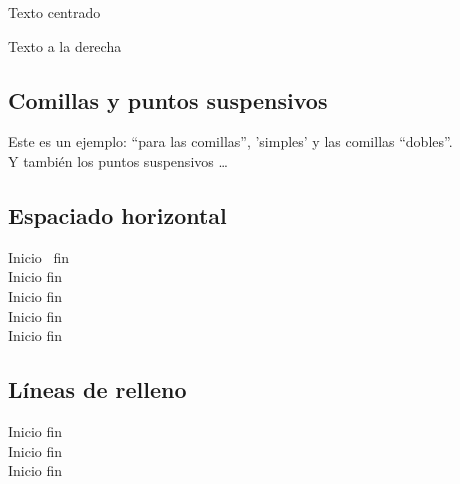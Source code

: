 \documentclass[12pt]{article}
\begin{document}
\begin{center}
Texto centrado
\end{center}

\begin{flushright}
Texto a la derecha
\end{flushright}

\subsection{Comillas y puntos suspensivos}

Este es un ejemplo: “para las comillas”, 'simples' y las comillas “dobles”. \\
Y también los puntos suspensivos \dots %

\subsection{Espaciado horizontal}
\noindent Inicio \, fin \\[0.2cm]
Inicio \quad fin \\[0.2cm]
Inicio \qquad fin \\[0.2cm]
Inicio \hspace{3cm} fin \\[0.2cm]
Inicio \hfill fin \\[0.2cm]
\subsection{Líneas de relleno}
\noindent Inicio \hfill fin \\[0.5cm]
Inicio \hrulefill fin \\[0.5cm]
Inicio \dotfill fin \\[0.5cm]


\end{document}
